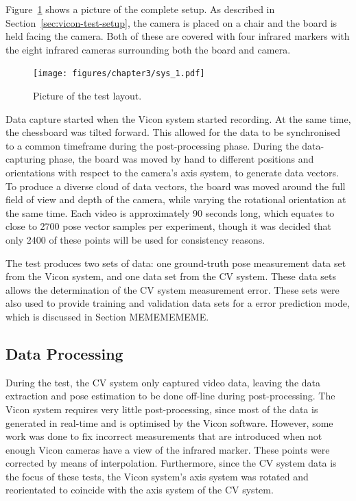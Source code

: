 Figure~\ref{fig:pic-sys-layout} shows a picture of the complete setup. As described in Section~\ref{sec:vicon-test-setup}, the camera is placed on a chair and the board is held facing the camera. Both of these are covered with four infrared markers with the eight infrared cameras surrounding both the board and camera.  

\begin{figure}
  \centering
  \texttt{[image: figures/chapter3/sys\_1.pdf]}
  \caption{Picture of the test layout.}
\label{fig:pic-sys-layout}
\end{figure}

Data capture started when the Vicon system started recording. At the same time, the chessboard was tilted forward. This allowed for the data to be synchronised to a common timeframe during the post-processing phase. During the data-capturing phase, the board was moved by hand to different positions and orientations with respect to the camera's axis system, to generate data vectors. To produce a diverse cloud of data vectors, the board was moved around the full field of view and depth of the camera, while varying the rotational orientation at the same time. Each video is approximately 90 seconds long, which equates to close to 2700 pose vector samples per experiment, though it was decided that only 2400 of these points will be used for consistency reasons. 

The test produces two sets of data: one ground-truth pose measurement data set from the Vicon system, and one data set from the CV system. These data sets allows the determination of the CV system measurement error. These sets were also used to provide training and validation data sets for a error prediction mode, which is discussed in Section MEMEMEMEME.

\subsection{Data Processing}

During the test, the CV system only captured video data, leaving the data extraction and pose estimation to be done off-line during post-processing. The Vicon system requires very little post-processing, since most of the data is generated in real-time and is optimised by the Vicon software. However, some work was done to fix incorrect measurements that are introduced when not enough Vicon cameras have a view of the infrared marker. These points were corrected by means of interpolation. Furthermore, since the CV system data is the focus of these tests, the Vicon system's axis system was rotated and reorientated to coincide with the axis system of the CV system.

